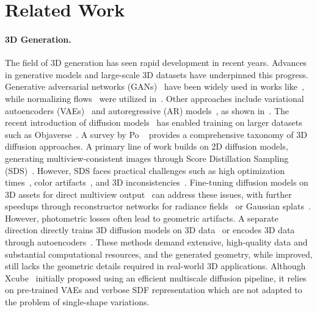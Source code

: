 \section{Related Work}
\label{sec:related}

\paragraph{3D Generation.} %
The field of 3D generation has seen rapid development in recent years. Advances in generative models and large-scale 3D datasets have underpinned this progress. Generative adversarial networks (GANs)~\cite{goodfellow2020generative} have been widely used in works like~\cite{achlioptas2018learning, gao2022get3d, chan2022efficient}, while normalizing flows~\cite{rezende2015variational} were utilized in~\cite{yang2019pointflow}. Other approaches include variational autoencoders (VAEs)~\cite{kingma2019introduction} and autoregressive (AR) models~\cite{bengio1994learning, graves2013generating, van2016pixel}, as shown in~\cite{park2019deepsdf, zhang20223dilg, siddiqui2024meshgpt, yin2023shapegpt, nash2020polygen,chen2024meshanything}.
The recent introduction of diffusion models~\cite{sohl2015deep, ho2020denoising} has enabled training on larger datasets such as Objaverse~\cite{deitke2024objaverse}. A survey by Po \etal~\cite{po2024state} provides a comprehensive taxonomy of 3D diffusion approaches. A primary line of work builds on 2D diffusion models, generating multiview-consistent images through Score Distillation Sampling (SDS)~\cite{poole2023dreamfusion, wang2023score}. However, SDS faces practical challenges such as high optimization times~\cite{metzer2023latent, liang2024luciddreamer}, color artifacts~\cite{lukoianov2024score, chen2023fantasia3d, wang2024prolificdreamer, li2024sweetdreamer}, and 3D inconsistencies~\cite{liu2024syncdreamer, wang2024taming}.
Fine-tuning diffusion models on 3D assets for direct multiview output~\cite{shi2024mvdream, liu2023zero, qiu2024richdreamer, long2024wonder3d, lin2023magic3d} can address these issues, with further speedups through reconstructor networks for radiance fields~\cite{li2024instantd, chen2023single, liu2024one, wei2024meshlrm, wang2024pflrm} or Gaussian splats~\cite{zhang2025gs, xu2024grm, zou2024triplane}. However, photometric losses often lead to geometric artifacts.
A separate direction directly trains 3D diffusion models on 3D data~\cite{luo2021diffusion, nichol2022point} or encodes 3D data through autoencoders~\cite{cheng2023sdfusion, gupta20233dgen, zhang20233dshape2vecset,vahdat2022lion, jun2023shap, zhao2024michelangelo, ren2024xcube, ren2024scube, zhang2024clay}. These methods demand extensive, high-quality data and substantial computational resources, and the generated geometry, while improved, still lacks the geometric details required in real-world 3D applications. Although Xcube~\cite{ren2024xcube} initially proposed using an efficient multiscale diffusion pipeline, it relies on pre-trained VAEs and verbose SDF representation which are not adapted to the problem of single-shape variations.
